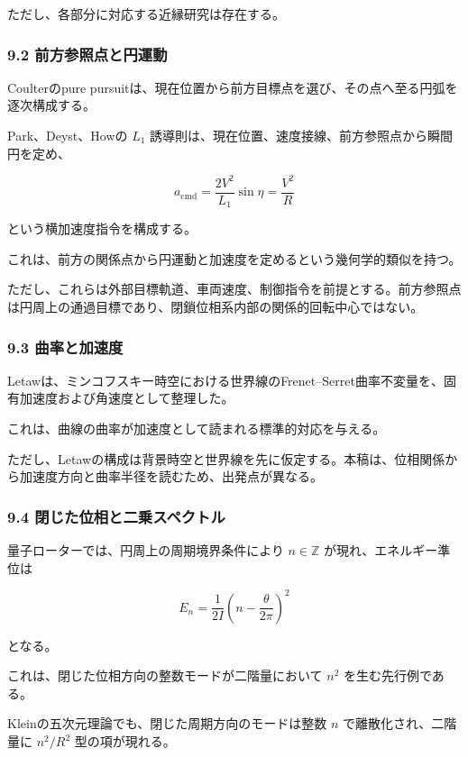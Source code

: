 \documentclass[
  a4paper,
]{ltjsarticle}
\begin{document}
ただし、各部分に対応する近縁研究は存在する。

\subsubsection{9.2
前方参照点と円運動}\label{ux524dux65b9ux53c2ux7167ux70b9ux3068ux5186ux904bux52d5}

Coulterのpure
pursuitは、現在位置から前方目標点を選び、その点へ至る円弧を逐次構成する。

Park、Deyst、Howの \(L_1\)
誘導則は、現在位置、速度接線、前方参照点から瞬間円を定め、

\[
a_{\mathrm{cmd}}
=\frac{2V^2}{L_1}\sin\eta
=\frac{V^2}{R}
\]

という横加速度指令を構成する。

これは、前方の関係点から円運動と加速度を定めるという幾何学的類似を持つ。

ただし、これらは外部目標軌道、車両速度、制御指令を前提とする。前方参照点は円周上の通過目標であり、閉鎖位相系内部の関係的回転中心ではない。

\subsubsection{9.3
曲率と加速度}\label{ux66f2ux7387ux3068ux52a0ux901fux5ea6}

Letawは、ミンコフスキー時空における世界線のFrenet--Serret曲率不変量を、固有加速度および角速度として整理した。

これは、曲線の曲率が加速度として読まれる標準的対応を与える。

ただし、Letawの構成は背景時空と世界線を先に仮定する。本稿は、位相関係から加速度方向と曲率半径を読むため、出発点が異なる。

\subsubsection{9.4
閉じた位相と二乗スペクトル}\label{ux9589ux3058ux305fux4f4dux76f8ux3068ux4e8cux4e57ux30b9ux30daux30afux30c8ux30eb}

量子ローターでは、円周上の周期境界条件により \(n\in\mathbb Z\)
が現れ、エネルギー準位は

\[
E_n
=\frac{1}{2I}
\left(
n-\frac{\theta}{2\pi}
\right)^2
\]

となる。

これは、閉じた位相方向の整数モードが二階量において \(n^2\)
を生む先行例である。

Kleinの五次元理論でも、閉じた周期方向のモードは整数 \(n\)
で離散化され、二階量に \(n^2/R^2\) 型の項が現れる。
\end{document}
